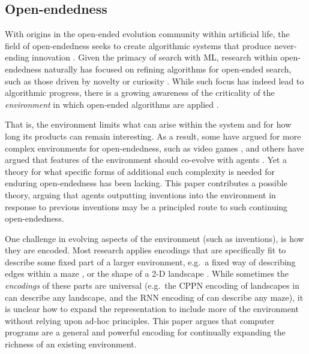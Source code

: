 \documentclass{article}
\begin{document}
\subsection{Open-endedness}

With origins in the open-ended evolution community \cite{taylor:alife12,taylor2016open,bedau:open,standish:ijcia03} within artificial life, the field of open-endedness seeks to create algorithmic systems that produce never-ending innovation \cite{stanley:open}. Given the primacy of search with ML, research within open-endedness naturally has focused on refining algorithms for open-ended search, such as those driven by novelty \cite{lehman:ecj11,mouret:ec12} or curiosity \cite{pathak2017curiosity,stanton:curiosity}. While such focus has indeed lead to algorithmic progress, there is a growing awareness of the criticality of the \emph{environment} in which open-ended algorithms are applied \cite{grbic:evocraft,earle2021video,wang2020enhanced,soros:alife14}.

That is, the environment limits what can arise within the system and for how long its products can remain interesting. As a result, some have argued for more complex environments for open-endedness, such as video games \cite{grbic:evocraft,earle2021video}, and others have argued that features of the environment should co-evolve with agents \cite{wang2020enhanced,dennis2020emergent}. Yet a theory for what specific forms of additional such complexity is needed for enduring open-endedness has been lacking. This paper contributes a possible theory, arguing that agents
outputting inventions into the environment in response to previous inventions may be a principled
route to such continuing open-endedness.

One challenge in evolving aspects of the environment (such as inventions), is how they are encoded. Most research applies encodings that are specifically fit to describe some fixed part of a larger environment, e.g.\ a fixed way of describing edges within a maze \cite{brant:mcc}, or the shape of a 2-D landscape \cite{wang2020enhanced}. While sometimes the \emph{encodings} of these parts are universal (e.g.\ the CPPN encoding of landscapes in \cite{wang2020enhanced} can describe any landscape, and the RNN encoding of \citet{dennis2020emergent} can describe any maze), it is unclear how to expand the representation to include more of the environment without relying upon ad-hoc principles. This paper argues that computer programs are a general and powerful encoding for continually expanding the richness of an existing environment.
\end{document}
